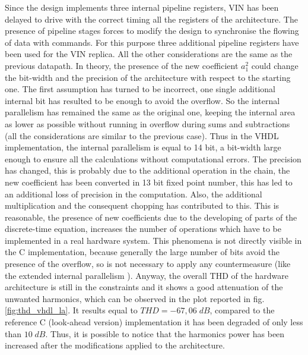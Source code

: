 \documentclass[a4paper, titlepage]{article}
\begin{document}
\noindent
Since the design implements three internal pipeline registers, VIN has been delayed to drive with the correct timing all the registers of the architecture. The presence of pipeline stages forces to modify the design to synchronise the flowing of data with commands. 
For this purpose three additional pipeline registers have been used for the VIN replica. All the other considerations are the same as the previous datapath.
\newline
In theory, the presence of the new coefficient $a_1^2$ could change the bit-width and the precision of the architecture with respect to the starting one. The first assumption has turned to be incorrect, one single additional internal bit has resulted to be enough to avoid the overflow. So the internal parallelism has remained the same as the original one, keeping the internal area as lower as possible without running in overflow during sums and subtractions (all the considerations are similar to the previous case).
Thus in the VHDL implementation, the internal parallelism is equal to 14 bit, a bit-width large enough to ensure all the calculations without computational errors.
The precision has changed, this is probably due to the additional operation in the chain, the new coefficient has been converted in 13 bit fixed point number, this has led to an additional loss of precision in the computation. Also, the additional multiplication and the consequent chopping has contributed to this. This is reasonable, the presence of new coefficients due to the developing of parts of the discrete-time equation, increases the number of operations which have to be implemented in a real hardware system. %
This phenomena is not directly visible in the C implementation, because generally the large number of bits avoid the presence of the overflow, so is not necessary to apply any countermeasure (like the extended internal parallelism ).
\newline
Anyway, the overall THD  of the hardware architecture is still in the constraints and it shows a good attenuation of the unwanted harmonics, which can be observed in the plot reported in fig.\ref{fig:thd_vhdl_la}. It results equal to $THD=-67,06 \; dB$, compared to the reference C (look-ahead version) implementation it has been degraded of only less than $10 \; dB$. Thus, it is possible to notice that the harmonics power has been increased after the modifications applied to the architecture.
\end{document}
